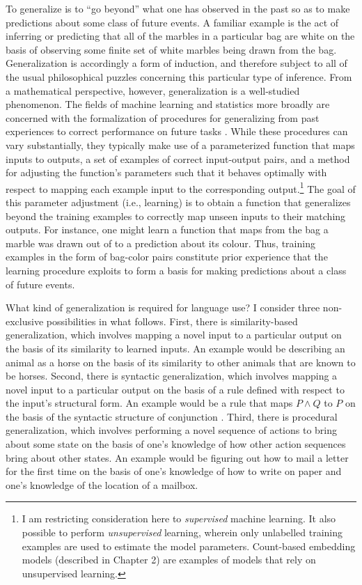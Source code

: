 To generalize is to ``go beyond'' what one has observed in the past so as to make predictions about some class of future events. A familiar example is the act of inferring or predicting that all of the marbles in a particular bag are white on the basis of observing some finite set of white marbles being drawn from the bag. Generalization is accordingly a form of induction, and therefore subject to all of the usual philosophical puzzles concerning this particular type of inference. From a mathematical perspective, however, generalization is a well-studied phenomenon. The fields of machine learning and statistics more broadly are concerned with the formalization of procedures for generalizing from past experiences to correct performance on future tasks \citep[][p. 6]{LiangPotts:2015}. While these procedures can vary substantially, they typically make use of a parameterized function that maps inputs to outputs, a set of examples of correct input-output pairs, and a method for adjusting the function's parameters such that it behaves optimally with respect to mapping each example input to the corresponding output.\footnote{I am restricting consideration here to \textit{supervised} machine learning. It also possible to perform \textit{unsupervised} learning, wherein only unlabelled training examples are used to estimate the model parameters. Count-based embedding models (described in Chapter 2) are examples of models that rely on unsupervised learning.} The goal of this parameter adjustment (i.e., learning) is to obtain a function that generalizes beyond the training examples to correctly map unseen inputs to their matching outputs. For instance, one might learn a function that maps from the bag a marble was drawn out of to a prediction about its colour. Thus, training examples in the form of bag-color pairs constitute prior experience that the learning procedure exploits to form a basis for making predictions about a class of future events. 

What kind of generalization is required for language use? I consider three non-exclusive possibilities in what follows. First, there is similarity-based generalization, which involves mapping a novel input to a particular output on the basis of its similarity to learned inputs. An example would be describing an animal as a horse on the basis of its similarity to other animals that are known to be horses. Second, there is syntactic generalization, which involves mapping a novel input to a particular output on the basis of a rule defined with respect to the input's structural form. An example would be a rule that maps $P \land Q$ to $P$ on the basis of the syntactic structure of conjunction \citep{FodorPylyshyn:1988}. Third, there is procedural generalization, which involves performing a novel sequence of actions to bring about some state on the basis of one's knowledge of how other action sequences bring about other states. An example would be figuring out how to mail a letter for the first time on the basis of one's knowledge of how to write on paper and one's knowledge of the location of a mailbox. 

